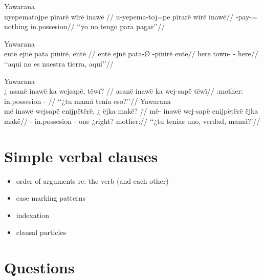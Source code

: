 \documentclass{memoir}
\begin{document}
\ex Yawarana \\
\label{poss-neg-advsubj-pirare-locpred}    \begingl
    \glpreamble uyepematojpe pïrarë wïrë inawë //
    \gla u-yepema-toj=pe pïrarë wïrë inawë//
    \glb {}-pay-= nothing  in.possesion//
        \glft ‘‘yo no tengo para pagar’’//  
    \endgl 
\xe

\ex Yawarana \\
\label{poss-neg-part-pinire-nsubj}    \begingl
    \glpreamble entë ejnë pata pïnirë, entë //
    \gla entë ejnë pata-Ø -pïnirë entë//
    \glb here  town- - here//
        \glft ‘‘aqui no es nuestra tierra, aquí’’//  
    \endgl 
\xe

\pex\label{poss-q-locpred-cop-nsubj}    \a Yawarana\\
    \label{convamgu-325}        \begingl
        \glpreamble ¿ asanë inawë ka wejsapë, tëwï? //
        \gla asanë inawë ka wej-sapë tëwï//
        \glb {}:mother: in.possesion  - //
            \glft ‘‘¿tu mamá tenía eso?’’//  
        \endgl 
    \a Yawarana\\
    \label{histyarirdi-827}        \begingl
        \glpreamble më inawë wejsapë enijpëtërë, ¿ ëjka makë? //
        \gla më- inawë wej-sapë enijpëtërë ëjka makë//
        \glb {}- in.possesion - one ¿right? mother://
            \glft ‘‘¿tu tenías uno, verdad, mamá?’//  
        \endgl 
\xe

\chapter{\texorpdfstring{Simple verbal clauses
\label{simpleverb}}{Simple verbal clauses }}


\begin{itemize}
\tightlist
\item
  order of arguments re: the verb (and each other)
\item
  case marking patterns
\item
  indexation
\item
  clausal particles
\end{itemize}

\chapter{\texorpdfstring{Questions \label{questions}}{Questions }}
\end{document}
